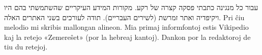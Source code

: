\enhavo
{}

\dulingvaujo
{עבור כל מנגינה כתבתי פסקה קצרה של רקע. מקורות המידע העיקריים שהשתמשתי בהם היו ויקיפדיה ואתר זמרשת (לשירים העבריים). תודה לעורכים בשני האתרים האלה.}
{Pri ĉiu melodio mi skribis mallongan alineon. Mia primaj informfontoj estis Vikipedio kaj la retejo «Zemereŝet» (por la hebreaj kantoj). Dankon por la redaktoroj de tiu du retejoj.}

\vspace{2ex}
\apartigilo


\renewcommand{\notesname}{}
\LTRmulticolcolumns
\begin{LTR}
	\begin{multicols}{2}
		\theendnotes
	\end{multicols}
\end{LTR}
\clearpage
